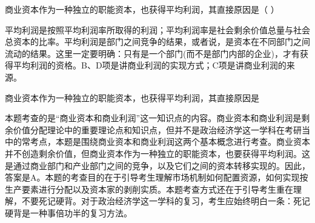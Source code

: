 \question 商业资本作为一种独立的职能资本，也获得平均利润，其直接原因是（ ）
\par{}
\begin{solution}平均利润是按照平均利润率所取得的利润；平均利润率是社会剩余价值总量与社会总资本的比率。平均利润是部门之间竞争的结果，或者说，是资本在不同部门之间流动的结果。这里一定要明确：只有是一个部门(而不是部门内部的企业)，才有获得平均利润的资格。B、D项是讲商业利润的实现方式；C项是讲商业利润的来源。
\end{solution}
\question 商业资本作为一种独立的职能资本，也获得平均利润，其直接原因是
\par{}
\begin{solution}本题考查的是``商业资本和商业利润''这一知识点的内容。商业资本和商业利润是剩余价值分配理论中的重要理论点和知识点，但并不是政治经济学这一学科在考研当中的常考点，本题是围绕商业资本和商业利润这两个基本概念进行考查。商业资本并不创造剩余价值，但商业资本作为一种独立的职能资本，也要获得平均利润。这是通过商业部门和产业部门之间的竞争，以及它们之间的资本转移实现的。因此，答案是A。本题的考查目的在于引导考生理解市场机制如何配置资源，如何实现按生产要素进行分配以及资本家的剥削实质。本题考查方式还在于引导考生重在理解，不要死记硬背。对于政治经济学这一学科的复习，考生应始终明白一条：死记硬背是一种事倍功半的复习方法。
\end{solution}
